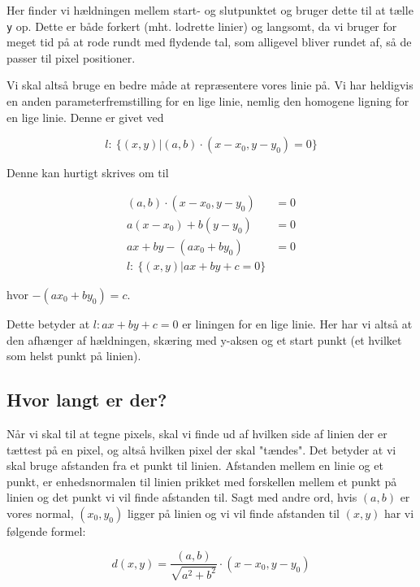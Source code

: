 \documentclass[a4paper, 10pt]{article}
\begin{document}
Her finder vi hældningen mellem start- og slutpunktet og bruger dette til at tælle \texttt{y} op.
Dette er både forkert (mht. lodrette linier) og langsomt, da vi bruger for meget tid på at rode rundt med flydende tal, som alligevel bliver rundet af, så de passer til pixel positioner.

Vi skal altså bruge en bedre måde at repræsentere vores linie på.
Vi har heldigvis en anden parameterfremstilling for en lige linie, nemlig den homogene ligning for en lige linie.
Denne er givet ved

\begin{equation}
l:\ \Big\lbrace \left( x, y \right) | \left( a, b \right) \cdot \left( x - x_0, y - y_0 \right) = 0 \Big\rbrace
\end{equation}

Denne kan hurtigt skrives om til

\begin{align}
\left( a, b \right) \cdot \left( x - x_0, y - y_0 \right) &= 0 \nonumber\\
a \left( x - x_0 \right) + b \left( y - y_0 \right) &= 0 \nonumber\\
ax + by - \left( ax_0 + by_0 \right) &= 0 \nonumber\\
l:\ \Big\lbrace \left( x, y \right) | ax + by + c = 0 \Big\rbrace \nonumber
\end{align}

hvor $-\left( ax_0 + by_0 \right) = c$.

Dette betyder at $l: ax + by + c = 0$ er liningen for en lige linie.
Her har vi altså at den afhænger af hældningen, skæring med y-aksen og et start punkt (et hvilket som helst punkt på linien).

\subsection{Hvor langt er der?}
Når vi skal til at tegne pixels, skal vi finde ud af hvilken side af linien der er tættest på en pixel, og altså hvilken pixel der skal "tændes".
Det betyder at vi skal bruge afstanden fra et punkt til linien.
Afstanden mellem en linie og et punkt, er enhedsnormalen til linien prikket med forskellen mellem et punkt på linien og det punkt vi vil finde afstanden til.
Sagt med andre ord, hvis $(a, b)$ er vores normal, $(x_0, y_0)$ ligger på linien og vi vil finde afstanden til $(x,y)$ har vi følgende formel:

\begin{equation}
d(x,y) = \frac{(a,b)}{\sqrt{a^2 + b^2}} \cdot (x-x_0, y-y_0) \label{afstand}
\end{equation}
\end{document}
